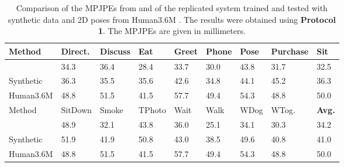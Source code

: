 \begin{table}[t]	
	\centering
	\begin{tabularx}{\textwidth}{l *{8}{Y}}
		\toprule
		Method & Direct. & Discuss & Eat & Greet & Phone & Pose & Purchase & Sit \\
		\midrule
		\citet{drover18} & 34.3 & 36.4 & 28.4 & 33.7 & 30.0 & 43.8 & 31.7 & 32.5\\
		Synthetic & 36.3 & 35.5 & 35.6 & 42.6 & 34.8 & 44.1 & 45.2 & 36.3 \\
		Human3.6M & 48.8 & 51.5 & 41.5 & 57.7 & 49.4 & 54.3 & 48.8 & 50.0 \\
		\bottomrule
		\toprule
		Method & SitDown & Smoke & TPhoto & Wait & Walk & WDog & WTog. & \textbf{Avg.}\\
		\midrule
		\citet{drover18} & 48.9 & 32.1 & 43.8 & 36.0 & 25.1 & 34.1 & 30.3 & 34.2\\
		Synthetic & 51.9 & 41.9 & 50.8 & 43.0 & 38.5 & 49.6 & 40.8 & 41.0 \\
		Human3.6M & 48.8 & 51.5 & 41.5 & 57.7 & 49.4 & 54.3 & 48.8 & 50.0 \\
		\bottomrule
	\end{tabularx}
	\caption{
		Comparison of the MPJPEs from \cite{drover18} and of the replicated system trained and tested with synthetic data and 2D poses from Human3.6M \cite{ionescu14}.
		The results were obtained using \textbf{Protocol 1}. The MPJPEs are given in millimeters.
	 }
	\label{tbl:results-original-protocol1}
\end{table}
